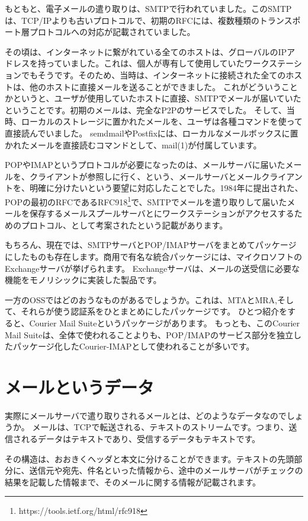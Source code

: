 もともと、電子メールの遣り取りは、SMTPで行われていました。このSMTPは、TCP/IPよりも古いプロトコルで、初期のRFCには、複数種類のトランスポート層プロトコルへの対応が記載されていました。

その頃は、インターネットに繋がれている全てのホストは、グローバルのIPアドレスを持っていました。これは、個人が専有して使用していたワークステーションでもそうです。そのため、当時は、インターネットに接続された全てのホストは、他のホストに直接メールを送ることができました。
これがどういうことかというと、ユーザが使用していたホストに直接、SMTPでメールが届いていたということです。初期のメールは、完全なP2Pのサービスでした。
そして、当時、ローカルのストレージに置かれたメールを、ユーザは各種コマンドを使って直接読んでいました。
semdmailやPostfixには、ローカルなメールボックスに置かれたメールを直接読むコマンドとして、mail(1)が付属しています。


POPやIMAPというプロトコルが必要になったのは、メールサーバに届いたメールを、クライアントが参照しに行く、という、メールサーバとメールクライアントを、明確に分けたいという要望に対応したことでした。1984年に提出された、POPの最初のRFCであるRFC918\footnote{https://tools.ietf.org/html/rfc918}で、SMTPでメールを遣り取りして届いたメールを保存するメールスプールサーバとにワークステーションがアクセスするためのプロトコル、として考案されたという記載があります。



もちろん、現在では、SMTPサーバとPOP/IMAPサーバをまとめてパッケージにしたものも存在します。商用で有名な統合パッケージには、マイクロソフトのExchangeサーバが挙げられます。
Exchangeサーバは、メールの送受信に必要な機能をモノリシックに実装した製品です。

一方のOSSではどのおうなものがあるでしょうか。これは、MTAとMRA,そして、それらが使う認証系をひとまとめにしたパッケージです。
ひとつ紹介をすると、Courier Mail Suiteというパッケージがあります。
もっとも、このCourier Mail Suiteは、全体で使われることよりも、POP/IMAPのサービス部分を独立したパッケージ化したCourier-IMAPとして使われることが多いです。

\section{メールというデータ}
実際にメールサーバで遣り取りされるメールとは、どのようなデータなのでしょうか。
メールは、TCPで転送される、テキストのストリームです。つまり、送信されるデータはテキストであり、受信するデータもテキストです。

その構造は、おおきくヘッダと本文に分けることができます。テキストの先頭部分に、送信元や宛先、件名といった情報から、途中のメールサーバがチェックの結果を記載した情報まで、そのメールに関する情報が記載されます。


